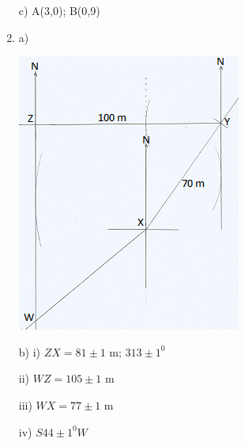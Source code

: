 \documentclass[
  a4paperpaper,
]{scrbook}
\begin{document}
\begin{tcolorbox}
\begin{enumerate}
  c) A(3,0); B(0,9)
\item
  a)

  \includegraphics{figures/M7_N21.png}

  b) i) \(ZX=81\pm 1\) m; \(313\pm1^0\)

  ii) \(WZ=105\pm1\) m

  iii) \(WX=77\pm1\) m

  iv) \(S44\pm1^0W\)
\end{enumerate}

\end{tcolorbox}
\end{document}
